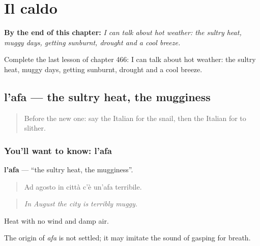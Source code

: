 
\chapter{Il caldo}
\label{ch:it-il-caldo}

\begin{chapteropening}
\textbf{By the end of this chapter:} \emph{I can talk about hot weather: the sultry heat, muggy days, getting sunburnt, drought and a cool breeze.}

Complete the last lesson of chapter 466: I can talk about hot weather: the sultry heat, muggy days, getting sunburnt, drought and a cool breeze.
\end{chapteropening}

\section[l'afa]{l'afa — the sultry heat, the mugginess}

\label{lesson:IT-C466-afa}



\begin{quote}
Before the new one: say the Italian for the snail, then the Italian for to slither.
\end{quote}

\subsection*{You'll want to know: l'afa}
\textbf{l'afa} — \textquotedblleft{}the sultry heat, the mugginess\textquotedblright{}.

\begin{quote}
Ad agosto in città c'è un'afa terribile.
\end{quote}

\begin{quote}
\emph{In August the city is terribly muggy.}
\end{quote}

Heat with no wind and damp air.

\begin{cousinweb}
The origin of \emph{afa} is not settled; it may imitate the sound of gasping for breath.
\end{cousinweb}

